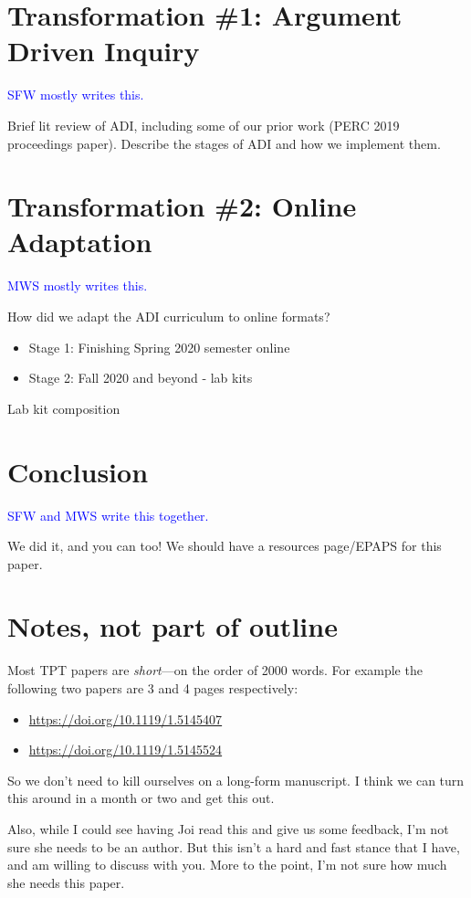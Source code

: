 \documentclass{article}
\begin{document}
\section{Transformation \#1: Argument Driven Inquiry}
\textcolor{blue}{SFW mostly writes this.}

Brief lit review of ADI, including some of our prior work (PERC 2019 proceedings paper).
Describe the stages of ADI and how we implement them.

\section{Transformation \#2: Online Adaptation}
\textcolor{blue}{MWS mostly writes this.}

How did we adapt the ADI curriculum to online formats?
\begin{itemize}
  \item Stage 1: Finishing Spring 2020 semester online
  \item Stage 2: Fall 2020 and beyond - lab kits
\end{itemize}
Lab kit composition

\section{Conclusion}
\textcolor{blue}{SFW and MWS write this together.}

We did it, and you can too!  We should have a resources page/EPAPS for this paper.

\section{Notes, not part of outline}
Most TPT papers are \emph{short}---on the order of 2000 words.  For example the following two
papers are 3 and 4 pages respectively:
\begin{itemize}
  \item \url{https://doi.org/10.1119/1.5145407}
  \item \url{https://doi.org/10.1119/1.5145524}
\end{itemize}
So we don't need to kill ourselves on a long-form manuscript.  I think we can turn this around
in a month or two and get this out.

Also, while I could see having Joi read this and give us some feedback, I'm not sure she needs
to be an author.  But this isn't a hard and fast stance that I have, and am willing to discuss
with you.  More to the point, I'm not sure how much she needs this paper.
\end{document}
